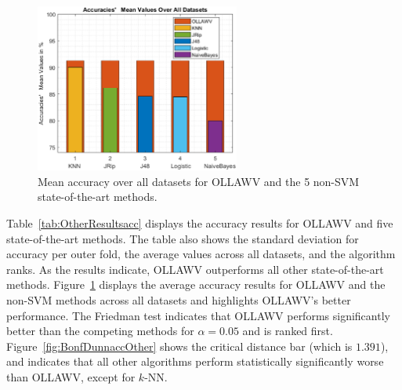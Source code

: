 \documentclass[reqno]{vcuthesis}
\numberwithin{equation}{chapter}
\begin{document}
\begin{table}[t!]
\begin{minipage}{0.9\textwidth}
{}
\captionsetup{width=\linewidth}
\label{fig:BonfDunnaccOther}
\end{minipage}
\end{table}

\begin{figure}
\centering
\includegraphics[width=0.6\textwidth]{figures/others.eps}
\caption{\small Mean accuracy over all datasets for OLLAWV and the 5 non-SVM state-of-the-art methods.}
\label{fig:accother}
\end{figure}
Table~\ref{tab:OtherResultsacc} displays the accuracy results for OLLAWV and five state-of-the-art methods. The table also shows the standard deviation for accuracy per outer fold, the average values across all datasets, and the algorithm ranks. As the results indicate, OLLAWV outperforms all other state-of-the-art methods. Figure~\ref{fig:accother} displays the average accuracy results for OLLAWV and the non-SVM methods across all datasets and highlights OLLAWV's better performance. The Friedman test indicates that OLLAWV performs significantly better than the competing methods for $\alpha = 0.05$ and is ranked first. Figure~\ref{fig:BonfDunnaccOther} shows the critical distance bar (which is $1.391$), and indicates that all other algorithms perform statistically significantly worse than OLLAWV, except for $k$-NN. 
\end{document}
